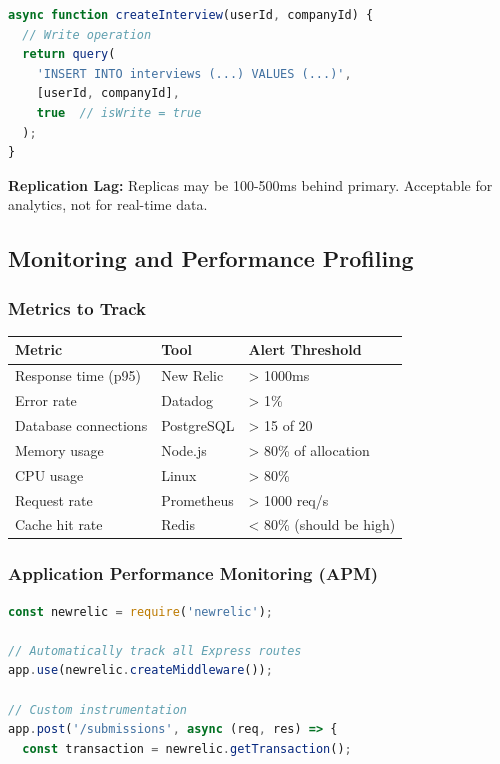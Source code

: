 \documentclass[12pt,a4paper,oneside]{article}
\begin{document}
{{\begin{lstlisting}[language=JavaScript, caption=Read Replica Routing]
async function createInterview(userId, companyId) {
  // Write operation
  return query(
    'INSERT INTO interviews (...) VALUES (...)',
    [userId, companyId],
    true  // isWrite = true
  );
}
\end{lstlisting}

\textbf{Replication Lag:} Replicas may be 100-500ms behind primary. Acceptable for analytics, not for real-time data.

\subsection{Monitoring and Performance Profiling}

\subsubsection{Metrics to Track}

\begin{table}[H]
\centering
\small
\begin{tabular}{|p{2.3cm}|p{2cm}|p{7.7cm}|}
\hline
\textbf{Metric} & \textbf{Tool} & \textbf{Alert Threshold} \\
\hline
Response time (p95) & New Relic & > 1000ms \\
\hline
Error rate & Datadog & > 1\% \\
\hline
Database connections & PostgreSQL & > 15 of 20 \\
\hline
Memory usage & Node.js & > 80\% of allocation \\
\hline
CPU usage & Linux & > 80\% \\
\hline
Request rate & Prometheus & > 1000 req/s \\
\hline
Cache hit rate & Redis & < 80\% (should be high) \\
\hline
\end{tabular}
\end{table}

\subsubsection{Application Performance Monitoring (APM)}

\begin{lstlisting}[language=JavaScript, caption=APM Integration (New Relic)]
const newrelic = require('newrelic');

// Automatically track all Express routes
app.use(newrelic.createMiddleware());

// Custom instrumentation
app.post('/submissions', async (req, res) => {
  const transaction = newrelic.getTransaction();
  

\end{lstlisting}}}
\end{document}
